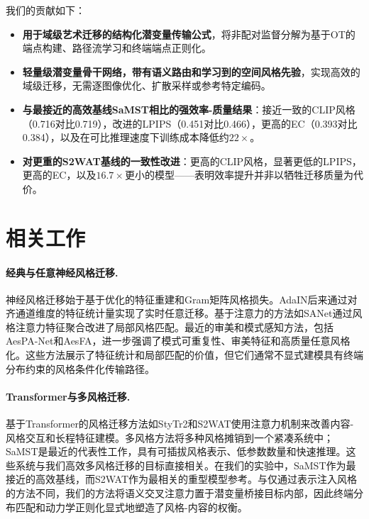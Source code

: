 ﻿\documentclass[letterpaper]{article}
\begin{document}
我们的贡献如下：
\begin{itemize}
    \item \textbf{用于域级艺术迁移的结构化潜变量传输公式}，将非配对监督分解为基于OT的端点构建、路径流学习和终端端点正则化。
    \item \textbf{轻量级潜变量骨干网络，带有语义路由和学习到的空间风格先验}，实现高效的域级迁移，无需逐图像优化、扩散采样或参考特定编码。
    \item \textbf{与最接近的高效基线SaMST相比的强效率-质量结果}：接近一致的CLIP风格（0.716对比0.719），改进的LPIPS（0.451对比0.466），更高的EC（0.393对比0.384），以及在可比推理速度下训练成本降低约$22\times$。
    \item \textbf{对更重的S2WAT基线的一致性改进}：更高的CLIP风格，显著更低的LPIPS，更高的EC，以及$16.7\times$更小的模型——表明效率提升并非以牺牲迁移质量为代价。
\end{itemize}

\section{相关工作}
\paragraph{经典与任意神经风格迁移.}
神经风格迁移始于基于优化的特征重建和Gram矩阵风格损失\cite{gatys2016image}。AdaIN后来通过对齐通道维度的特征统计量实现了实时任意迁移\cite{huang2017adain}。基于注意力的方法如SANet通过风格注意力特征聚合改进了局部风格匹配\cite{park2019sanet}。最近的审美和模式感知方法，包括AesPA-Net和AesFA，进一步强调了模式可重复性、审美特征和高质量任意风格化\cite{hong2023aespa,huang2024aesfa}。这些方法展示了特征统计和局部匹配的价值，但它们通常不显式建模具有终端分布约束的风格条件化传输路径。

\paragraph{Transformer与多风格迁移.}
基于Transformer的风格迁移方法如StyTr2和S2WAT使用注意力机制来改善内容-风格交互和长程特征建模\cite{deng2022stytr2,xia2024s2wat}。多风格方法将多种风格摊销到一个紧凑系统中；SaMST是最近的代表性工作，具有可插拔风格表示、低参数数量和快速推理\cite{liu2024samst}。这些系统与我们高效多风格迁移的目标直接相关。在我们的实验中，SaMST作为最接近的高效基线，而S2WAT作为最相关的重型模型参考。与仅通过表示注入风格的方法不同，我们的方法将语义交叉注意力置于潜变量桥接目标内部，因此终端分布匹配和动力学正则化显式地塑造了风格-内容的权衡。
\end{document}
